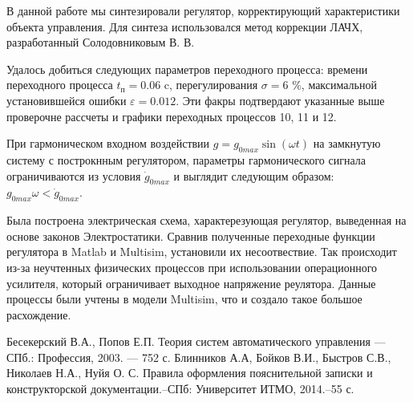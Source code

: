 \documentclass[russian, utf8]{eskdtext}
\begin{document}
В данной работе мы синтезировали регулятор, корректирующий характеристики объекта управления. Для синтеза использовался метод коррекции ЛАЧХ, разработанный Солодовниковым В. В. \par
Удалось добиться следующих параметров переходного процесса: времени переходного процесса $t_\text{п} = 0.06$ c, перегулирования $\sigma = 6$ \%, максимальной установившейся ошибки $\varepsilon = 0.012$. Эти факры подтвердают указанные выше проверочне рассчеты и графики переходных процессов 10, 11 и 12. \par
При гармоническом входном воздействии $g = g_{0max}\sin{(\omega t)}$ на замкнутую систему с построкнным регулятором, параметры гармонического сигнала ограничиваются из условия $\dot{g}_{0max}$ и выглядит следующим образом: $g_{0max} \omega < \dot{g}_{0max}$. \par
Была построена электрическая схема, характерезующая регулятор, выведенная на основе законов Электростатики. Сравнив полученные переходные функции регулятора в Matlab и Multisim, установили их несоотвествие. Так происходит из-за неучтенных физических процессов при использовании операционного усилителя, который ограничивает выходное напряжение реулятора. Данные процессы были учтены в модели Multisim, что и создало такое большое расхождение.



\newpage

\begin{thebibliography}{}
      Бесекерский В.А., Попов Е.П. Теория систем автоматического управления — СПб.: Профессия, 2003. — 752 с.
      Блинников А.А, Бойков В.И., Быстров С.В., Николаев Н.А., Нуйя О. С. Правила оформления пояснительной записки и конструкторской документации.–СПб: Университет ИТМО, 2014.–55 с.
\end{thebibliography}
\end{document}
